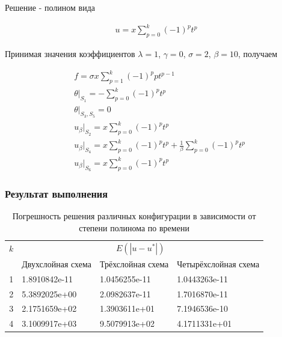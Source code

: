 \documentclass[12pt]{article}
\begin{document}
\noindent Решение - полином вида

\begin{align}
  u = x\sum_{p=0}^{k}(-1)^p t^p
\end{align}

\vspace{5mm}
\noindent Принимая значения коэффициентов 
  $\lambda = 1$, $\gamma = 0$, $\sigma = 2$, $\beta = 10$, получаем

\begin{align*}
  & f = \sigma x \sum_{p=1}^{k}(-1)^p p t^{p-1} \\
  & \theta|_{S_1} = -\sum_{p=0}^{k}(-1)^p t^p \\
  & \theta|_{S_3, S_5} = 0 \\
  & u_{\beta}|_{S_2} = x\sum_{p=0}^{k}(-1)^p t^p \\
  & u_{\beta}|_{S_4} = x\sum_{p=0}^{k}(-1)^p t^p + \frac{1}{\beta}\sum_{p=0}^{k}(-1)^p t^p \\
  & u_{\beta}|_{S_6} = x\sum_{p=0}^{k}(-1)^p t^p
\end{align*}

\subsubsection{Результат выполнения}

\begin{table}[H]
  \begin{tabularx}{\textwidth}{cYYY}
    \toprule
      $k$ &                               \\
    \cmidrule(lr){2-4}
          & Двухслойная схема   & Трёхслойная схема  & Четырёхслойная схема \\
       & 1.8910842e-11 & 1.0456255e-11 & 1.0443263e-11                   \\
      2   & 5.3892025e+00 & 2.0982637e-11 & 1.7016870e-11                   \\
      3   & 2.1751659e+02 & 1.3903611e+01 & 7.1946536e-10                   \\
      4   & 3.1009917e+03 & 9.5079913e+02 & 4.1711331e+01                   \\
    \bottomrule
  \end{tabularx}

  \captionsetup{justification=centering}
  \caption{Погрешность решения различных конфигурации в зависимости от степени полинома по времени}
\end{table}
\end{document}
